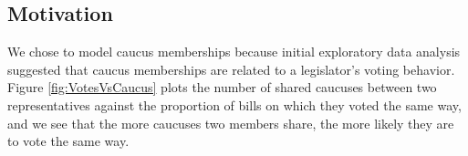 \documentclass{article}
\begin{document}
\subsection{Motivation} 

%



We chose to model caucus memberships because initial exploratory data analysis suggested that caucus memberships are related to a legislator's voting behavior. Figure \ref{fig:VotesVsCaucus} plots the number of shared caucuses between two representatives against the proportion of bills on which they voted the same way, and we see that the more caucuses two members share, the more likely they are to vote the same way. 
\end{document}

